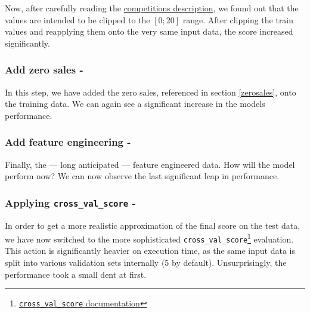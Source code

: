 Now, after carefully reading the \href{https://www.kaggle.com/c/competitive-data-science-predict-future-sales/overview/evaluation}{competitions description}, we found out that the values are intended to be clipped to the $[0;20]$ range. After clipping the train values and reapplying them onto the very same input data, the score increased significantly.

\subsubsection{Add zero sales - }

In this step, we have added the zero sales, referenced in section \ref{zerosales}, onto the training data. We can again see a significant increase in the models performance.


\subsubsection{Add feature engineering - }

Finally, the --- long anticipated --- feature engineered data. How will the model perform now? We can now observe the last significant leap in performance.

\subsubsection{Applying \texttt{cross\_val\_score} - }

In order to get a more realistic approximation of the final score on the test data, we have now switched to the more sophisticated \texttt{cross\_val\_score}\footnote{\href{https://scikit-learn.org/stable/modules/generated/sklearn.model_selection.cross_val_score.html}{\texttt{cross\_val\_score} documentation}} evaluation. This action is significantly heavier on execution time, as the same input data is split into various validation sets internally (5 by default).
Unsurprisingly, the performance took a small dent at first.

